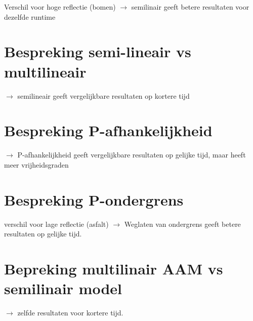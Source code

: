 \documentclass[12pt]{report}
\begin{document}
Verschil voor hoge reflectie (bomen)
$\rightarrow$ semilinair geeft betere resultaten voor dezelfde runtime

\section{Bespreking semi-lineair vs multilineair}

$\rightarrow$ semilineair geeft vergelijkbare resultaten op kortere tijd

\section{Bespreking P-afhankelijkheid}

$\rightarrow$ P-afhankelijkheid geeft vergelijkbare resultaten op gelijke tijd, maar heeft meer vrijheidsgraden

\section{Bespreking P-ondergrens}

verschil voor lage reflectie (asfalt)
$\rightarrow$ Weglaten van ondergrens geeft betere resultaten op gelijke tijd.

\section{Bepreking multilinair AAM vs semilinair model}

$\rightarrow$ zelfde resultaten voor kortere tijd.

\begin{appendices}


\end{appendices}


\begin{flushleft}
\nocite{*}
{}


\end{flushleft}
\end{document}
